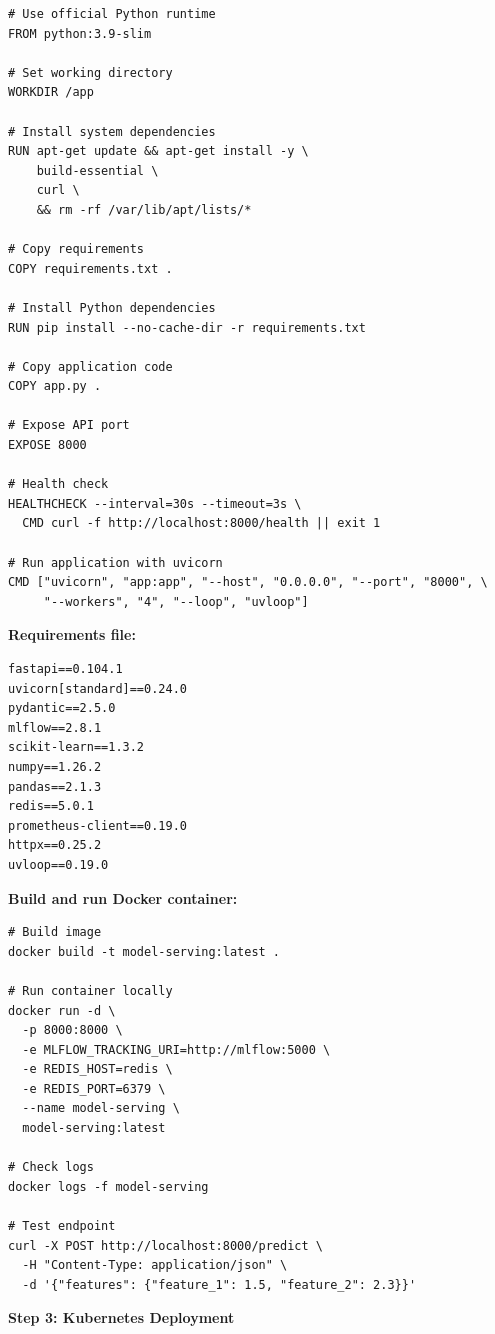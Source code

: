 \begin{lstlisting}[caption=Dockerfile for Production Serving]
# Use official Python runtime
FROM python:3.9-slim

# Set working directory
WORKDIR /app

# Install system dependencies
RUN apt-get update && apt-get install -y \
    build-essential \
    curl \
    && rm -rf /var/lib/apt/lists/*

# Copy requirements
COPY requirements.txt .

# Install Python dependencies
RUN pip install --no-cache-dir -r requirements.txt

# Copy application code
COPY app.py .

# Expose API port
EXPOSE 8000

# Health check
HEALTHCHECK --interval=30s --timeout=3s \
  CMD curl -f http://localhost:8000/health || exit 1

# Run application with uvicorn
CMD ["uvicorn", "app:app", "--host", "0.0.0.0", "--port", "8000", \
     "--workers", "4", "--loop", "uvloop"]
\end{lstlisting}

\textbf{Requirements file:}

\begin{lstlisting}[caption=requirements.txt]
fastapi==0.104.1
uvicorn[standard]==0.24.0
pydantic==2.5.0
mlflow==2.8.1
scikit-learn==1.3.2
numpy==1.26.2
pandas==2.1.3
redis==5.0.1
prometheus-client==0.19.0
httpx==0.25.2
uvloop==0.19.0
\end{lstlisting}

\textbf{Build and run Docker container:}

\begin{lstlisting}[style=shell, caption=Docker Commands]
# Build image
docker build -t model-serving:latest .

# Run container locally
docker run -d \
  -p 8000:8000 \
  -e MLFLOW_TRACKING_URI=http://mlflow:5000 \
  -e REDIS_HOST=redis \
  -e REDIS_PORT=6379 \
  --name model-serving \
  model-serving:latest

# Check logs
docker logs -f model-serving

# Test endpoint
curl -X POST http://localhost:8000/predict \
  -H "Content-Type: application/json" \
  -d '{"features": {"feature_1": 1.5, "feature_2": 2.3}}'
\end{lstlisting}

\textbf{Step 3: Kubernetes Deployment}

